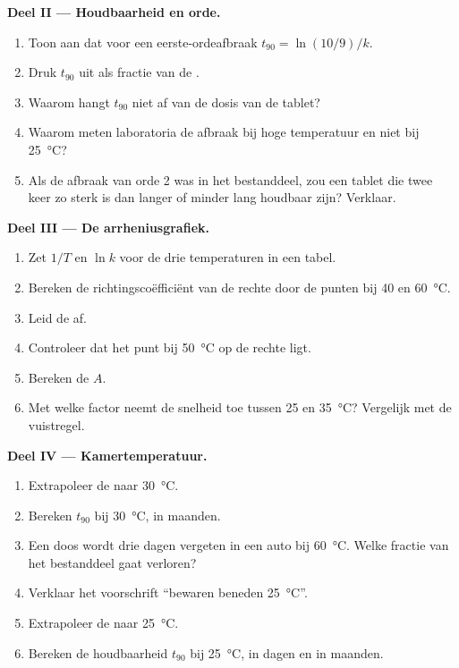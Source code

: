 \begin{problem}
\medskip
\noindent\textbf{Deel II --- Houdbaarheid en orde.}
\begin{enumerate}[resume]
  \item Toon aan dat voor een eerste-ordeafbraak $t_{90} = \ln(10/9)/k$.
  \item Druk $t_{90}$ uit als fractie van de .
  \item Waarom hangt $t_{90}$ niet af van de dosis van de tablet?
  \item Waarom meten laboratoria de afbraak bij hoge temperatuur en niet
        bij \qty{25}{\celsius}?
  \item Als de afbraak van orde 2 was in het bestanddeel, zou een tablet
        die twee keer zo sterk is dan langer of minder lang houdbaar
        zijn? Verklaar.
\end{enumerate}

\medskip
\noindent\textbf{Deel III --- De arrheniusgrafiek.}
\begin{enumerate}[resume]
  \item Zet $1/T$ en $\ln k$ voor de drie temperaturen in een tabel.
  \item Bereken de richtingscoëfficiënt van de rechte door de punten bij
        40 en \qty{60}{\celsius}.
  \item Leid de  af.
  \item Controleer dat het punt bij \qty{50}{\celsius} op de rechte ligt.
  \item Bereken de  $A$.
  \item Met welke factor neemt de snelheid toe tussen 25 en
        \qty{35}{\celsius}? Vergelijk met de vuistregel.
\end{enumerate}

\medskip
\noindent\textbf{Deel IV --- Kamertemperatuur.}
\begin{enumerate}[resume]
  \item Extrapoleer de  naar \qty{30}{\celsius}.
  \item Bereken $t_{90}$ bij \qty{30}{\celsius}, in maanden.
  \item Een doos wordt drie dagen vergeten in een auto bij
        \qty{60}{\celsius}. Welke fractie van het bestanddeel gaat
        verloren?
  \item Verklaar het voorschrift ``bewaren beneden \qty{25}{\celsius}''.
  \item Extrapoleer de  naar \qty{25}{\celsius}.
  \item Bereken de houdbaarheid $t_{90}$ bij \qty{25}{\celsius}, in dagen
        en in maanden.
\end{enumerate}
\end{problem}
